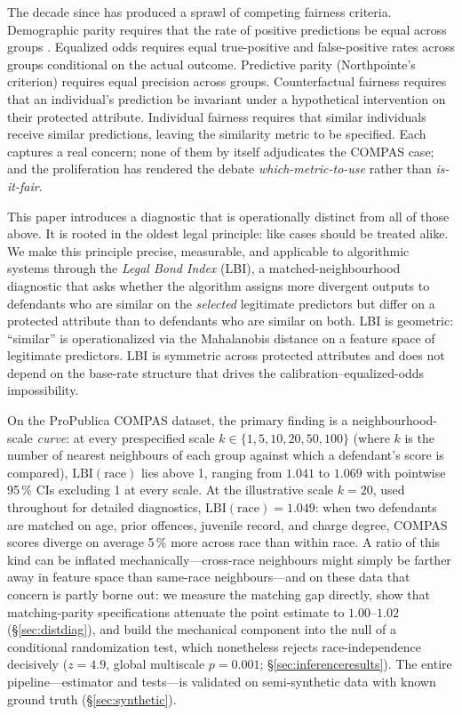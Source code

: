 \documentclass[11pt]{article}
\begin{document}
The decade since has produced a sprawl of competing fairness criteria.
Demographic parity requires that the rate of positive predictions be
equal across groups \citep{feldman2015}. Equalized odds
\citep{hardt2016} requires equal true-positive and false-positive
rates across groups conditional on the actual outcome. Predictive
parity (Northpointe's criterion) requires equal precision across
groups. Counterfactual fairness \citep{kusner2017} requires that an
individual's prediction be invariant under a hypothetical
intervention on their protected attribute. Individual fairness
\citep{dwork2012} requires that similar individuals receive similar
predictions, leaving the similarity metric to be specified. Each
captures a real concern; none of them by itself adjudicates the
COMPAS case; and the proliferation has rendered the debate
\emph{which-metric-to-use} rather than \emph{is-it-fair}.

This paper introduces a diagnostic that is operationally distinct from
all of those above. It is rooted in the oldest legal principle: like
cases should be treated alike. We make this principle precise,
measurable, and applicable to algorithmic systems through the
\emph{Legal Bond Index} (LBI), a matched-neighbourhood diagnostic that
asks whether the algorithm assigns more divergent outputs to defendants
who are similar on the \emph{selected} legitimate predictors but differ
on a protected attribute than to defendants who are similar on both.
LBI is geometric: ``similar'' is operationalized via the Mahalanobis
distance on a feature space of legitimate predictors. LBI is symmetric
across protected attributes and does not depend on the base-rate
structure that drives the calibration--equalized-odds impossibility.

On the ProPublica COMPAS dataset, the primary finding is a
neighbourhood-scale \emph{curve}: at every prespecified scale
$k \in \{1, 5, 10, 20, 50, 100\}$ (where $k$ is the number of nearest
neighbours of each group against which a defendant's score is
compared), $\mathrm{LBI}(\text{race})$ lies above 1, ranging from
$1.041$ to $1.069$ with pointwise 95\,\% CIs excluding 1 at every
scale. At the illustrative scale $k = 20$, used throughout for
detailed diagnostics, $\mathrm{LBI}(\text{race}) = 1.049$: when two
defendants are matched on age, prior offences, juvenile record, and
charge degree, COMPAS scores diverge on average 5\,\% more across
race than within race. A ratio of this kind can be inflated
mechanically---cross-race neighbours might simply be farther away in
feature space than same-race neighbours---and on these data that
concern is partly borne out: we measure the matching gap directly,
show that matching-parity specifications attenuate the point estimate
to $1.00$--$1.02$ (\S\ref{sec:distdiag}), and build the mechanical
component into the null of a conditional randomization test, which
nonetheless rejects race-independence decisively ($z = 4.9$, global
multiscale $p = 0.001$; \S\ref{sec:inferenceresults}). The entire
pipeline---estimator and tests---is validated on semi-synthetic data
with known ground truth (\S\ref{sec:synthetic}).
\end{document}
